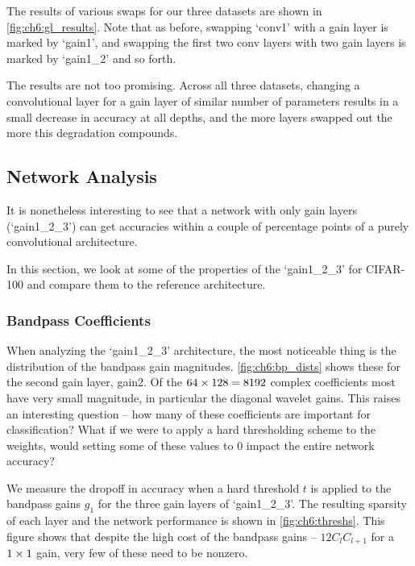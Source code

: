 The results of various swaps for our three datasets are shown in
\autoref{fig:ch6:gl_results}.
Note that as before, swapping `conv1' with a gain layer is marked by `gain1',
and swapping the first two conv layers with two gain layers is marked by
`gain1\_2' and so forth.  

The results are not too promising. Across all three datasets, changing a
convolutional layer for a gain layer of similar number of parameters
results in a small decrease in accuracy at all depths, and the more layers
swapped out the more this degradation compounds.


\subsection{Network Analysis}
It is nonetheless interesting to see that a network with only gain layers
(`gain1\_2\_3') can get accuracies within a couple of percentage points of a
purely convolutional architecture. 

In this section, we look at some of the properties of the `gain1\_2\_3' for
CIFAR-100 and compare them to the reference architecture.

\subsubsection{Bandpass Coefficients}
When analyzing the `gain1\_2\_3' architecture, the most noticeable thing is the
distribution of the bandpass gain magnitudes. \autoref{fig:ch6:bp_dists} shows
these for the second gain layer, gain2. Of the $64\times 128=8192$ complex
coefficients most have very small magnitude, in particular the diagonal wavelet
gains. This raises an interesting question -- how many of these coefficients are
important for classification? What if we were to apply a hard thresholding
scheme to the weights, would setting some of these values to 0 impact the
entire network accuracy? 

We measure the dropoff in accuracy when a hard threshold $t$ is applied to the 
bandpass gains $g_1$ for the three gain layers of `gain1\_2\_3'. The resulting sparsity
of each layer and the network performance is shown in \autoref{fig:ch6:threshs}.
This figure shows that despite the high cost of the bandpass gains --
$12C_{l}C_{l+1}$ for a $1\times1$ gain, very few of these need to be nonzero.

